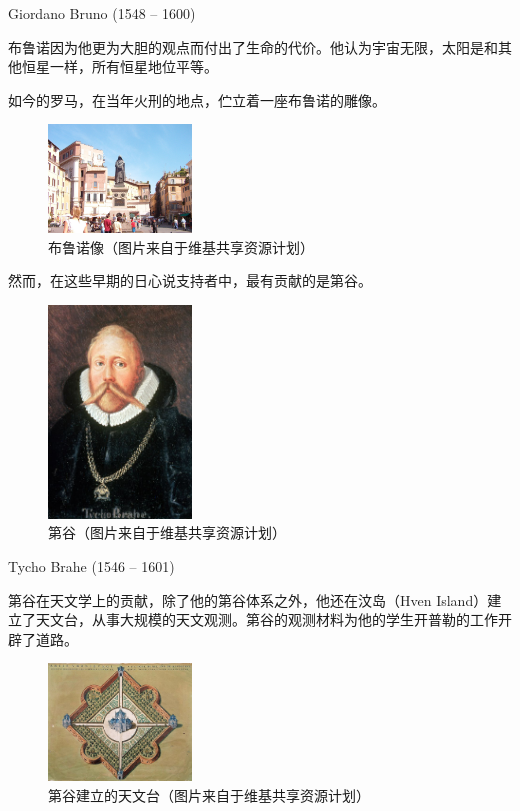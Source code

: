 \documentclass[a4paper,10.5pt]{book}
\begin{document}
Giordano Bruno (1548 – 1600)

布鲁诺因为他更为大胆的观点而付出了生命的代价。他认为宇宙无限，太阳是和其他恒星一样，所有恒星地位平等。

如今的罗马，在当年火刑的地点，伫立着一座布鲁诺的雕像。

\begin{figure}[ht]
\centering
\includegraphics[width=1.5in]{images/1_07-Brunostatue.jpg}
\caption{布鲁诺像（图片来自于维基共享资源计划）}
\end{figure}

然而，在这些早期的日心说支持者中，最有贡献的是第谷。

\begin{figure}[ht]
\centering
\includegraphics[width=1.5in]{images/1_08-Tycho_Brahe.jpg}
\caption{第谷（图片来自于维基共享资源计划）}
\end{figure}

Tycho Brahe (1546 – 1601)

第谷在天文学上的贡献，除了他的第谷体系之外，他还在汶岛（Hven Island）建立了天文台，从事大规模的天文观测。第谷的观测材料为他的学生开普勒的工作开辟了道路。

\begin{figure}[ht]
\centering
\includegraphics[width=1.5in]{images/1_09-Uraniborgskiss.jpg}
\caption{第谷建立的天文台（图片来自于维基共享资源计划）}
\end{figure}
\end{document}
